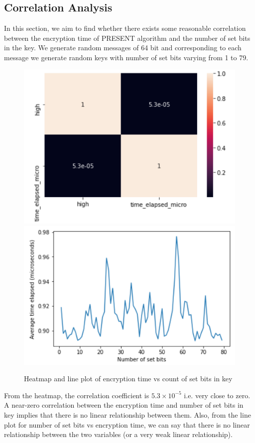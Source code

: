 \documentclass[preprint]{transcrypto}
\begin{document}
\subsection{Correlation Analysis \textsuperscript{\cite{7} \cite{9}}}
In this section, we aim to find whether there exists some reasonable correlation between the encryption time of PRESENT algorithm and the number of set bits in the key. We generate random messages of 64 bit and corresponding to each message we generate random keys with number of set bits varying from 1 to 79.
\begin{figure}[h!]
  \includegraphics[width=\linewidth]{heatmap.PNG}
\endminipage\hfill
{}
  \includegraphics[width=\linewidth]{lineplot.PNG}
\endminipage
\caption{Heatmap and line plot of encryption time vs count of set bits in key}
\end{figure}
From the heatmap, the correlation coefficient is $5.3 \times 10^{-5}$ i.e. very close to zero. A near-zero correlation between the encryption time and number of set bits in key implies that there is no linear relationship between them. Also, from the line plot for number of set bits vs encryption time, we can say that there is no linear relationship between the two variables (or a very weak linear relationship).
\end{document}
